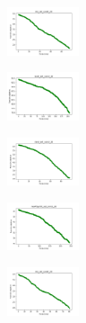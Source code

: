 \begin{figure}[H]
    \centering
    \begin{subfigure}
        \centering
        \includegraphics[width=0.234\textwidth]{img/bl/iris_set_const_20_949004259_cost.png}
    \end{subfigure}
    \hfill
    \begin{subfigure}
        \centering
        \includegraphics[width=0.234\textwidth]{img/bl/ecoli_set_const_20_949004259_cost.png}
    \end{subfigure}
    \hfill
    \begin{subfigure}
        \centering
        \includegraphics[width=0.234\textwidth]{img/bl/rand_set_const_20_949004259_cost.png}
    \end{subfigure}
    \hfill
    \begin{subfigure}
        \centering
        \includegraphics[width=0.234\textwidth]{img/bl/newthyroid_set_const_20_949004259_cost.png}
    \end{subfigure}
    \hfill
    \begin{subfigure}
        \centering
        \includegraphics[width=0.234\textwidth]{img/bl/iris_set_const_20_589741062_cost.png}
    \end{subfigure}
    \hfill
    \begin{subfigure}

\end{subfigure}
\end{figure}
